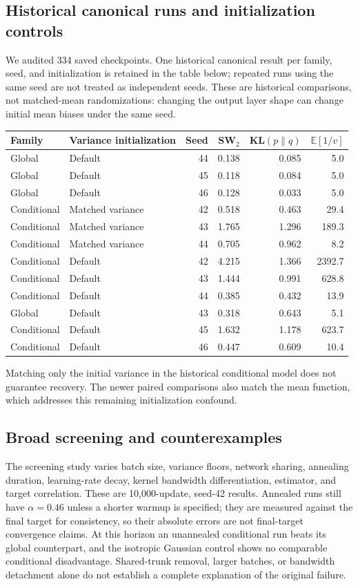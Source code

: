 \documentclass[11pt,a4paper]{article}
\numberwithin{equation}{section}
\newcommand{\E}{\mathbb E}
\begin{document}
\subsection{Historical canonical runs and initialization controls}
We audited 334 saved checkpoints. One historical canonical
result per family, seed, and initialization is retained in the table below;
repeated runs using the same seed are not treated as independent seeds.
These are historical comparisons, not matched-mean randomizations: changing
the output layer shape can change initial mean biases under the same seed.
\begin{center}\small
\begin{tabular}{llrrrr}\toprule
Family & Variance initialization & Seed & SW$_2$ & KL$(p\|q)$ & $\E[1/v]$\\\midrule
Global & Default & 44 & 0.138 & 0.085 & 5.0 \\
Global & Default & 45 & 0.118 & 0.084 & 5.0 \\
Global & Default & 46 & 0.128 & 0.033 & 5.0 \\
Conditional & Matched variance & 42 & 0.518 & 0.463 & 29.4 \\
Conditional & Matched variance & 43 & 1.765 & 1.296 & 189.3 \\
Conditional & Matched variance & 44 & 0.705 & 0.962 & 8.2 \\
Conditional & Default & 42 & 4.215 & 1.366 & 2392.7 \\
Conditional & Default & 43 & 1.444 & 0.991 & 628.8 \\
Conditional & Default & 44 & 0.385 & 0.432 & 13.9 \\
Global & Default & 43 & 0.318 & 0.643 & 5.1 \\
Conditional & Default & 45 & 1.632 & 1.178 & 623.7 \\
Conditional & Default & 46 & 0.447 & 0.609 & 10.4 \\
\bottomrule\end{tabular}
\end{center}
Matching only the initial variance in the historical conditional model does
not guarantee recovery. The newer paired comparisons also match the mean
function, which addresses this remaining initialization confound.

\subsection{Broad screening and counterexamples}
The screening study varies batch size, variance floors, network sharing,
annealing duration, learning-rate decay, kernel bandwidth differentiation,
estimator, and target correlation. These are 10,000-update, seed-42 results.
Annealed runs still have $\alpha=0.46$ unless a shorter warmup is specified;
they are measured against the final target for consistency, so their absolute
errors are not final-target convergence claims. At this horizon an unannealed
conditional run beats its global counterpart, and the isotropic Gaussian
control shows no comparable conditional disadvantage. Shared-trunk removal,
larger batches, or bandwidth detachment alone do not establish a complete
explanation of the original failure.
\end{document}

